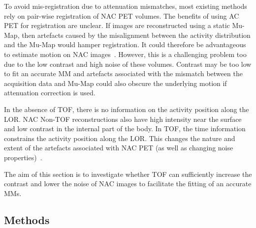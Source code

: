         To avoid mis-registration due to attenuation mismatches, most existing methods rely on pair-wise registration of \gls{NAC} \gls{PET} volumes. The benefits of using \gls{AC} \gls{PET} for registration are unclear. If images are reconstructed using a static \gls{Mu-Map}, then artefacts caused by the misalignment between the activity distribution and the \gls{Mu-Map} would hamper registration. It could therefore be advantageous to estimate motion on \gls{NAC} images~\parencite{LungMotionDiaphragmBaiBib, Kalantari2017AttenuationRegistration:, Dawood2008RespiratoryAlgorithms, Dawood2006LungImages}. However, this is a challenging problem too due to the low contrast and high noise of these volumes. Contrast may be too low to fit an accurate \gls{MM} and artefacts associated with the mismatch between the acquisition data and \gls{Mu-Map} could also obscure the underlying motion if attenuation correction is used.
        
        In the absence of \gls{TOF}, there is no information on the activity position along the \gls{LOR}. \gls{NAC} \gls{Non-TOF} reconstructions also have high intensity near the surface and low contrast in the internal part of the body. In \gls{TOF}, the time information constrains the activity position along the \gls{LOR}. This changes the nature and extent of the artefacts associated with \gls{NAC} \gls{PET} (as well as changing noise properties)~\parencite{Ter-Pogossian1981}.
        
        The aim of this section is to investigate whether \gls{TOF} can sufficiently increase the contrast and lower the noise of \gls{NAC} images to facilitate the fitting of an accurate \glspl{MM}.
        
        \subsection{Methods} \label{sec:impact_of_tof_on_respiratory_motion_model_estimation_using_pre_gated_no_intra_cycle_motion_nac_pet_methods}
            
            
